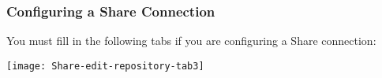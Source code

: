%
%

\subsubsection{Configuring a Share Connection}

You must fill in the following tabs if you are configuring a Share
connection:

\texttt{[image: Share-edit-repository-tab3]}

